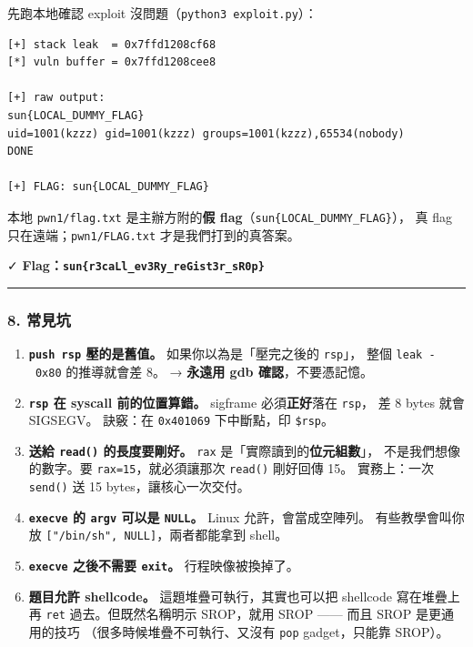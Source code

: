 \documentclass[10pt,a4paper]{article}
\providecommand{\tightlist}{%
  \setlength{\itemsep}{0pt}\setlength{\parskip}{0pt}}
\renewenvironment{quote}{%
  \begin{mdframed}[linewidth=0pt,innerleftmargin=0pt,innerrightmargin=0pt,
    innerbottommargin=0pt,innertopmargin=0pt,skipabove=0.55em,skipbelow=0.55em,
    leftmargin=0.9em,rightmargin=0.4em,startcode={\color{quotebar}\vrule width 2.6pt},%
    endcode={}]%
  \itshape\color{black}%
}{%
  \end{mdframed}%
}
\begin{document}
先跑本地確認 exploit 沒問題（\texttt{python3\ \allowbreak{}exploit.\allowbreak{}py}）：

\begin{Verbatim}[breaklines=true,breakanywhere=true,breakautoindent=false,fontsize=\fontsize{7.0}{9.5}\selectfont]
[+] stack leak  = 0x7ffd1208cf68
[*] vuln buffer = 0x7ffd1208cee8

[+] raw output:
sun{LOCAL_DUMMY_FLAG}
uid=1001(kzzz) gid=1001(kzzz) groups=1001(kzzz),65534(nobody)
DONE

[+] FLAG: sun{LOCAL_DUMMY_FLAG}
\end{Verbatim}

\begin{quote}
本地 \texttt{pwn1/\allowbreak{}flag.\allowbreak{}txt} 是主辦方附的\textbf{假
flag}（\texttt{sun\{\allowbreak{}LOCAL\_\allowbreak{}DUMMY\_\allowbreak{}FLAG\}\allowbreak{}}）， 真 flag
只在遠端；\texttt{pwn1/\allowbreak{}FLAG.\allowbreak{}txt} 才是我們打到的真答案。
\end{quote}

✓ \textbf{Flag：\texttt{sun\{\allowbreak{}r3caLl\_\allowbreak{}ev3Ry\_\allowbreak{}reGist3r\_\allowbreak{}sR0p\}\allowbreak{}}}

\begin{center}\rule{0.5\linewidth}{0.5pt}\end{center}

\subsubsection{8. 常見坑}\label{ux5e38ux898bux5751}

\begin{enumerate}
\def\labelenumi{\arabic{enumi}.}
\tightlist
\item
  \textbf{\texttt{push\ \allowbreak{}rsp} 壓的是舊值。} 如果你以為是「壓完之後的
  \texttt{rsp}」， 整個 \texttt{leak\ \allowbreak{}-\allowbreak{}\ \allowbreak{}0x80} 的推導就會差 8。 →
  \textbf{永遠用 gdb 確認}，不要憑記憶。
\item
  \textbf{\texttt{rsp} 在 syscall 前的位置算錯。} sigframe
  必須\textbf{正好}落在 \texttt{rsp}， 差 8 bytes 就會 SIGSEGV。
  訣竅：在 \texttt{0x401069} 下中斷點，印 \texttt{\$\allowbreak{}rsp}。
\item
  \textbf{送給 \texttt{read()} 的長度要剛好。} \texttt{rax}
  是「實際讀到的\textbf{位元組數}」， 不是我們想像的數字。要
  \texttt{rax=15}，就必須讓那次 \texttt{read()} 剛好回傳 15。
  實務上：一次 \texttt{send()} 送 15 bytes，讓核心一次交付。
\item
  \textbf{\texttt{execve} 的 \texttt{argv} 可以是 \texttt{NULL}。} Linux
  允許，會當成空陣列。 有些教學會叫你放
  \texttt{{[}"/\allowbreak{}bin/\allowbreak{}sh",\allowbreak{}\ \allowbreak{}NULL{]}}，兩者都能拿到 shell。
\item
  \textbf{\texttt{execve} 之後不需要 \texttt{exit}。} 行程映像被換掉了。
\item
  \textbf{題目允許 shellcode。} 這題堆疊可執行，其實也可以把 shellcode
  寫在堆疊上 再 \texttt{ret} 過去。但既然名稱明示 SROP，就用 SROP ------
  而且 SROP 是更通用的技巧 （很多時候堆疊不可執行、又沒有 \texttt{pop}
  gadget，只能靠 SROP）。
\end{enumerate}
\end{document}
